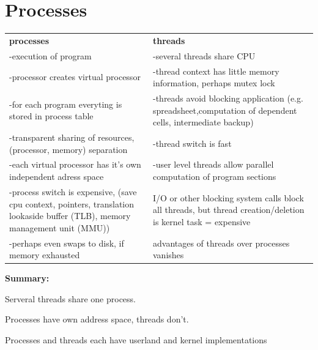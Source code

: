 \chapter{Processes}
\begin{tabular}{p{7cm} p{7cm}}
\textbf{processes}			&\textbf{threads}\\
-execution of program			&-several threads share CPU\\
-processor creates virtual processor	&-thread context has little memory information, perhaps mutex lock\\
-for each program everyting is stored in process table	&-threads avoid blocking application (e.g. spreadsheet,computation of dependent cells, intermediate backup)\\
-transparent sharing of resources,(processor, memory) separation&-thread switch is fast\\
-each virtual processor has it's own independent adress space&-user level threads allow parallel computation of program sections\\
-process switch is expensive, (save cpu context, pointers, translation lookaside buffer (TLB), memory management unit (MMU))&I/O or other blocking system calls block all threads, but thread creation/deletion is kernel task = expensive \\
-perhaps even swaps to disk, if memory exhausted& advantages of threads over processes vanishes\\
\end{tabular}

\textbf{Summary:}\\
\begin{compactitem}
\item Serveral threads share one process.
\item Processes have own address space, threads don't.
\item Processes and threads each have userland and kernel implementations
\end{compactitem}

